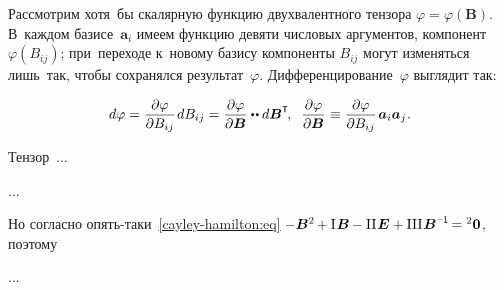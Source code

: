 \begin{otherlanguage}{russian}

Рассмотрим хотя~бы скалярную функцию двухвалентного тензора ${\varphi \!=\! \varphi(\bm{B})}$. В~каждом базисе~${\bm{a}_i}$ имеем функцию девяти числовых аргументов, компонент~${\varphi(B_{ij})}$; при~переходе к~новому базису компоненты ${B_{ij}}$ могут изменяться лишь~так, чтобы сохранялся результат~$\varphi$. Дифференцирование~$\varphi$ выглядит так:

\nopagebreak\vspace{-0.1em}\begin{equation}
d \varphi = \displaystyle \frac{\partial \varphi}{\partial B_{ij}} \hspace{0.2ex} d B_{ij} = \displaystyle \frac{\partial \varphi}{\partial \bm{B}} \dotdotp d \bm{B}^{\T} \hspace{-0.25ex} , \;\;
\displaystyle \frac{\partial \varphi}{\partial \bm{B}} \hspace{0.1ex} \equiv \displaystyle \frac{\partial \varphi}{\partial B_{ij}} \hspace{0.25ex} \bm{a}_i \bm{a}_j \hspace{0.1ex}.
\end{equation}

Тензор~...

...

Но согласно опять\hbox{-}таки~\eqref{cayley-hamilton:eq}
${\hspace{-0.1ex} -\bm{B}^{2} \hspace{-0.2ex} + \mathrm{I}\hspace{0.16ex} \bm{B} \hspace{-0.1ex} - \mathrm{II}\hspace{0.16ex} \bm{E} + \mathrm{III}\hspace{0.16ex} \bm{B}^{\expminusone} \hspace{-0.25ex} = {^2\bm{0}}}$, поэтому

...




\end{otherlanguage}
